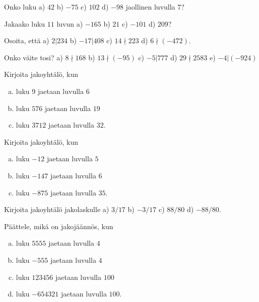 \begin{kotitehtavasivu}

\begin{tehtava}
	Onko luku a) $42$ b) $-75$ c) $102$ d) $-98$ jaollinen luvulla $7$?
\end{tehtava}

\begin{tehtava}
	Jakaako luku $11$ luvun a) $-165$ b) $21$ c) $-101$ d) $209$?
\end{tehtava}

\begin{tehtava}
	Osoita, että a) $2|234$ b) $-17|408$ c) $14 \nmid 223$ d) $6 \nmid (-472)$.
\end{tehtava}

\begin{tehtava}
	Onko väite tosi? a) $8 \nmid 168$ b) $13 \nmid (-95)$ c) $-5|777$ d) $29\nmid 2583$ e) $-4|(-924)$
\end{tehtava}

\begin{tehtava}
	Kirjoita jakoyhtälö, kun
	\begin{enumerate}[a)]
	\item luku $9$ jaetaan luvulla $6$
	\item luku $576$ jaetaan luvulla $19$
	\item luku $3712$ jaetaan luvulla $32$.
	\end{enumerate}
\end{tehtava}

\begin{tehtava}
	Kirjoita jakoyhtälö, kun
	\begin{enumerate}[a)]
	\item luku $-12$ jaetaan luvulla $5$
	\item luku $-147$ jaetaan luvulla $6$
	\item luku $-875$ jaetaan luvulla $35$.
	\end{enumerate}
\end{tehtava}

\begin{tehtava}
	Kirjoita jakoyhtälö jakolaskulle a) $3/17$ b) $-3/17$ c) $88/80$ d) $-88/80$.
\end{tehtava}

\begin{tehtava}
	Päättele, mikä on jakojäännös, kun
	\begin{enumerate}[a)]
	\item luku $5555$ jaetaan luvulla $4$
	\item luku $-555$ jaetaan luvulla $4$
	\item luku $123456$ jaetaan luvulla $100$
	\item luku $-654321$ jaetaan luvulla $100$.
	\end{enumerate}
\end{tehtava}


\end{kotitehtavasivu}
